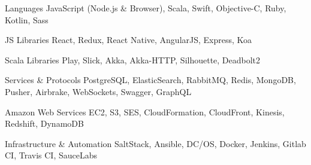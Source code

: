 
\begin{cvskills}

  \cvskill
    {Languages}
    {JavaScript (Node.js \& Browser), Scala, Swift, Objective-C, Ruby, Kotlin, Sass}

  \cvskill
    {JS Libraries}
    {React, Redux, React Native, AngularJS, Express, Koa}

  \cvskill
    {Scala Libraries}
    {Play, Slick, Akka, Akka-HTTP, Silhouette, Deadbolt2}

  \cvskill
    {Services \& Protocols}
    {PostgreSQL, ElasticSearch, RabbitMQ, Redis, MongoDB, Pusher, Airbrake, WebSockets, Swagger, GraphQL}

  \cvskill
    {Amazon Web Services}
    {EC2, S3, SES, CloudFormation, CloudFront, Kinesis, Redshift, DynamoDB}

  \cvskill
    {Infrastructure \& Automation}
    {SaltStack, Ansible, DC/OS, Docker, Jenkins, Gitlab CI, Travis CI, SauceLabs}

\end{cvskills}
